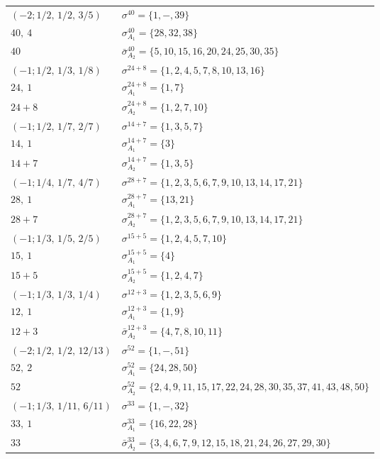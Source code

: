 \documentclass[pdftex]{sigma}
\theoremstyle{definition}
\numberwithin{equation}{section}
\begin{document}
\begin{table}[!t]\centering\renewcommand{\arraystretch}{1.22}
\begin{tabular}{|ll|}\hline
$(-2;1/2,\,1/2,\,3/5) $& $\sigma^{40} = \{1,-,39\}$ \\
$40,\ 4$& $\sigma_{A_{1}}^{40} = \{28,32,38\}$ \\
$40$ & $\bar\sigma_{A_{2}}^{40} = \{5,10,15,16,20,24,25,30,35\}$ \\
\hline
$(-1;1/2,\,1/3,\,1/8) $& $\sigma^{24 + 8} = \{1,2,4,5,7,8,10,13,16\}$ \\
$24,\ 1$& $\sigma_{A_{1}}^{24 + 8} = \{1,7\}$ \\
$24 + 8$ & $\sigma_{A_{2}}^{24 + 8} = \{1,2,7,10\}$ \\
\hline
$(-1;1/2,\,1/7,\,2/7) $& $\sigma^{14 + 7} = \{1,3,5,7\}$ \\
$14,\ 1$& $\sigma_{A_{1}}^{14 + 7} = \{3\}$ \\
$14 + 7$ & $\sigma_{A_{2}}^{14 + 7} = \{1,3,5\}$ \\
\hline
$(-1;1/4,\,1/7,\,4/7) $& $\sigma^{28 + 7} = \{1,2,3,5,6,7,9,10,13,14,17,21\}$ \\
$28,\ 1$& $\sigma_{A_{1}}^{28 + 7} = \{13,21\}$ \\
$28 + 7$ & $\sigma_{A_{2}}^{28 + 7} = \{1,2,3,5,6,7,9,10,13,14,17,21\}$ \\
\hline
$(-1;1/3,\,1/5,\,2/5) $& $\sigma^{15 + 5} = \{1,2,4,5,7,10\}$ \\
$15,\ 1$& $\sigma_{A_{1}}^{15 + 5} = \{4\}$ \\
$15 + 5$ & $\sigma_{A_{2}}^{15 + 5} = \{1,2,4,7\}$ \\
\hline
$(-1;1/3,\,1/3,\,1/4) $& $\sigma^{12 + 3} = \{1,2,3,5,6,9\}$ \\
$12,\ 1$& $\sigma_{A_{1}}^{12 + 3} = \{1,9\}$ \\
$12 + 3$ & $\bar\sigma_{A_{2}}^{12 + 3} = \{4,7,8,10,11\}$ \\
\hline
$(-2;1/2,\,1/2,\,12/13) $& $\sigma^{52} = \{1,-,51\}$ \\
$52,\ 2$& $\sigma_{A_{1}}^{52} = \{24,28,50\}$ \\
$52$ & $\sigma_{A_{2}}^{52} = \{2,4,9,11,15,17,22,24,28,30,35,37,41,43,48,50\}$ \\
\hline
$(-1;1/3,\,1/11,\,6/11) $& $\sigma^{33} = \{1,-,32\}$ \\
$33,\ 1$& $\sigma_{A_{1}}^{33} = \{16,22,28\}$ \\
$33$ & $\bar\sigma_{A_{2}}^{33} = \{3,4,6,7,9,12,15,18,21,24,26,27,29,30\}$ \\

\end{tabular}
\end{table}
\end{document}
